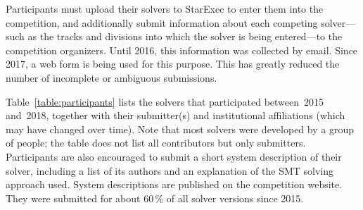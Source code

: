 \documentclass[dvipsnames,table,twoside,11pt]{article}
\begin{document}
Participants must upload their solvers to StarExec to enter them into
the competition, and additionally submit information about each
competing solver---such as the tracks and divisions into which the
solver is being entered---to the competition organizers.  Until 2016,
this information was collected by email.  Since 2017, a web form is
being used for this purpose.  This has greatly reduced the number of
incomplete or ambiguous submissions.

Table~\ref{table:participants} lists the solvers that participated
between~2015 and~2018, together with their submitter(s) and
institutional affiliations (which may have changed over time).  Note
that most solvers were developed by a group of people; the table does
not list all contributors but only submitters.
%
Participants are also encouraged to submit a short system description
of their solver, including a list of its authors and an explanation of
the SMT solving approach used.  System descriptions are published on
the competition website.  They were submitted for about 60\,\% of all
solver versions since 2015.
\end{document}
